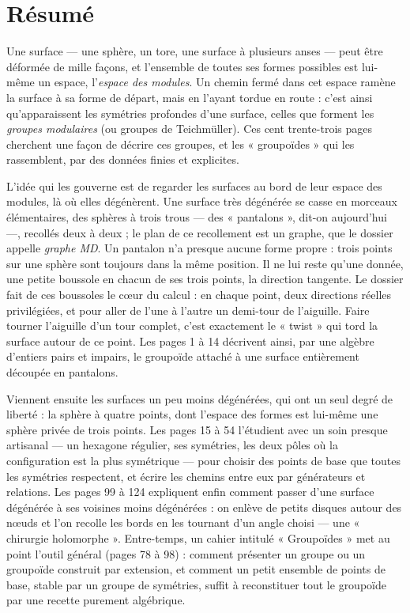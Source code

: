 \documentclass[11pt,a4paper]{article}
\begin{document}
\section*{Résumé}

\begin{resume}
Une surface — une sphère, un tore, une surface à plusieurs anses — peut être
déformée de mille façons, et l'ensemble de toutes ses formes possibles est
lui-même un espace, l'\emph{espace des modules}. Un chemin fermé dans cet
espace ramène la surface à sa forme de départ, mais en l'ayant tordue en
route : c'est ainsi qu'apparaissent les symétries profondes d'une surface,
celles que forment les \emph{groupes modulaires} (ou groupes de Teichmüller).
Ces cent trente-trois pages cherchent une façon de décrire ces groupes, et les
« groupoïdes » qui les rassemblent, par des données finies et explicites.

L'idée qui les gouverne est de regarder les surfaces au bord de leur espace
des modules, là où elles dégénèrent. Une surface très dégénérée se casse en
morceaux élémentaires, des sphères à trois trous — des « pantalons », dit-on
aujourd'hui —, recollés deux à deux ; le plan de ce recollement est un graphe,
que le dossier appelle \emph{graphe MD}. Un pantalon n'a presque aucune forme
propre : trois points sur une sphère sont toujours dans la même position.
Il ne lui reste qu'une donnée, une petite boussole en chacun de ses trois
points, la direction tangente. Le dossier fait de ces boussoles le cœur du
calcul : en chaque point, deux directions réelles privilégiées, et pour aller
de l'une à l'autre un demi-tour de l'aiguille. Faire tourner l'aiguille d'un
tour complet, c'est exactement le « twist » qui tord la surface autour de ce
point. Les pages 1 à 14 décrivent ainsi, par une algèbre d'entiers pairs et
impairs, le groupoïde attaché à une surface entièrement découpée en pantalons.

Viennent ensuite les surfaces un peu moins dégénérées, qui ont un seul degré
de liberté : la sphère à quatre points, dont l'espace des formes est lui-même
une sphère privée de trois points. Les pages 15 à 54 l'étudient avec un soin
presque artisanal — un hexagone régulier, ses symétries, les deux pôles où la
configuration est la plus symétrique — pour choisir des points de base que
toutes les symétries respectent, et écrire les chemins entre eux par
générateurs et relations. Les pages 99 à 124 expliquent enfin comment passer
d'une surface dégénérée à ses voisines moins dégénérées : on enlève de petits
disques autour des nœuds et l'on recolle les bords en les tournant d'un angle
choisi — une « chirurgie holomorphe ». Entre-temps, un cahier intitulé
« Groupoïdes » met au point l'outil général (pages 78 à 98) : comment
présenter un groupe ou un groupoïde construit par extension, et comment un
petit ensemble de points de base, stable par un groupe de symétries, suffit à
reconstituer tout le groupoïde par une recette purement algébrique.


\end{resume}
\end{document}
